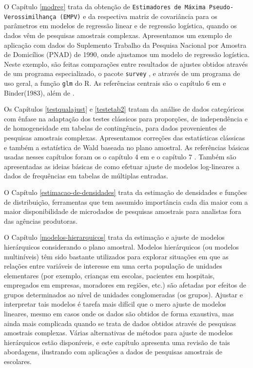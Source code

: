 \documentclass[]{book}
\theoremstyle{definition}
\theoremstyle{definition}
\theoremstyle{definition}
\theoremstyle{remark}
\begin{document}
O Capítulo \ref{modreg} trata da obtenção de
\texttt{Estimadores\ de\ Máxima\ Pseudo-Verossimilhança\ (EMPV)} e da
respectiva matriz de covariância para os parâmetros em modelos de
regressão linear e de regressão logística, quando os dados vêm de
pesquisas amostrais complexas. Apresentamos um exemplo de aplicação com
dados do Suplemento Trabalho da Pesquisa Nacional por Amostra de
Domicílios (PNAD) de 1990, onde ajustamos um modelo de regressão
logística. Neste exemplo, são feitas comparações entre resultados de
ajustes obtidos através de um programa especializado, o pacote
\texttt{survey} \citep{R-survey}, e através de um programa de uso geral,
a função \texttt{glm} do R. As referências centrais são o capítulo 6 em
\citep{Silva} e Binder(1983), além de \citep{Pessoa}.

Os Capítulos \ref{testqualajust} e \ref{testetab2} tratam da análise de
dados categóricos com ênfase na adaptação dos testes clássicos para
proporções, de independência e de homogeneidade em tabelas de
contingência, para dados provenientes de pesquisas amostrais complexas.
Apresentamos correções das estatísticas clássicas e também a estatística
de Wald baseada no plano amostral. As referências básicas usadas nesses
capítulos foram os o capítulo 4 em \citep{SHS89} e o capítulo 7
\citep{lethonen}. Também são apresentadas as ideias básicas de como
efetuar ajuste de modelos log-lineares a dados de frequências em tabelas
de múltiplas entradas.

O Capítulo \ref{estimacao-de-densidades} trata da estimação de
densidades e funções de distribuição, ferramentas que tem assumido
importância cada dia maior com a maior disponibilidade de microdados de
pesquisas amostrais para analistas fora das agências produtoras.

O Capítulo \ref{modelos-hierarquicos} trata da estimação e ajuste de
modelos hierárquicos considerando o plano amostral. Modelos hierárquicos
(ou modelos multiníveis) têm sido bastante utilizados para explorar
situações em que as relações entre variáveis de interesse em uma certa
população de unidades elementares (por exemplo, crianças em escolas,
pacientes em hospitais, empregados em empresas, moradores em regiões,
etc.) são afetadas por efeitos de grupos determinados ao nível de
unidades conglomeradas (os grupos). Ajustar e interpretar tais modelos é
tarefa mais difícil que o mero ajuste de modelos lineares, mesmo em
casos onde os dados são obtidos de forma exaustiva, mas ainda mais
complicada quando se trata de dados obtidos através de pesquisas
amostrais complexas. Várias alternativas de métodos para ajuste de
modelos hierárquicos estão disponíveis, e este capítulo apresenta uma
revisão de tais abordagens, ilustrando com aplicações a dados de
pesquisas amostrais de escolares.
\end{document}
